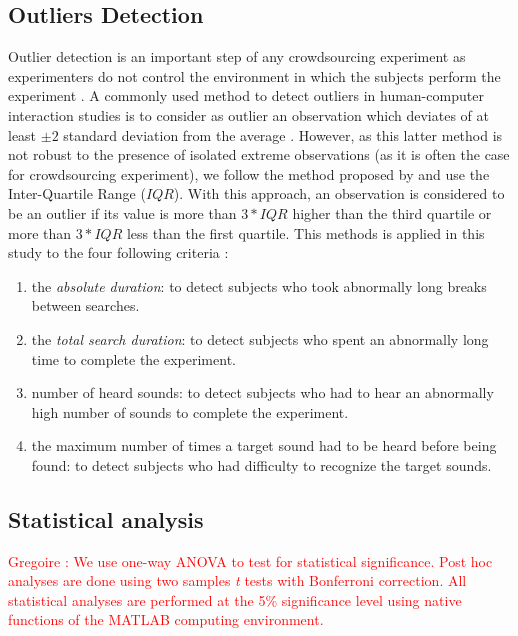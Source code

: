 \documentclass{aes2e}
\newcommand{\gl}[1]{\textcolor{red}{Gregoire : #1}}
\begin{document}
\subsection{Outliers Detection}

Outlier detection is an important step of any crowdsourcing experiment as experimenters do not control the environment in which the subjects perform the experiment \cite{komarov2013crowdsourcing,buchholz2011crowdsourcing}. A commonly used method to detect outliers in  human-computer interaction studies is to consider as outlier an observation  which deviates of at least $\pm2$ standard deviation from the average \cite{komarov2013crowdsourcing}. However, as this latter method is not robust to the presence of isolated extreme observations (as it is often the case for crowdsourcing experiment), we follow the  method proposed by \cite{komarov2013crowdsourcing} and use the Inter-Quartile Range ($IQR$). With this approach, an observation is considered to be an outlier if its value is more than $3*IQR$ higher than the third quartile or more than $3*IQR$ less than the first quartile. This methods is applied in this study to the four following criteria :

\begin{enumerate}
\item the \textit{absolute duration}: to detect subjects who took abnormally long breaks between searches.
\item the \textit{total search duration}: to detect subjects who spent an abnormally long time to complete the experiment.
\item number of heard sounds: to detect subjects who had to hear an abnormally high number of sounds to complete the experiment.
\item the maximum number of times a target sound had to be heard before being found: to detect subjects who had difficulty to recognize the target sounds.
\end{enumerate}

\subsection{Statistical analysis}

\gl{We use one-way ANOVA to test for statistical significance. Post hoc analyses are done using two samples \textit{t} tests with Bonferroni correction. All statistical analyses are performed at the 5\% significance level using native functions of the MATLAB computing environment.}
\end{document}
